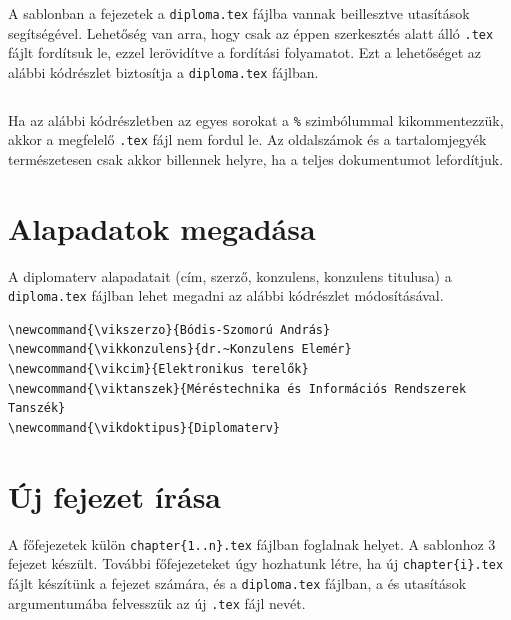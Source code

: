 A sablonban a fejezetek a \verb+diploma.tex+ fájlba vannak beillesztve \verb++ utasítások segítségével. Lehetőség van arra, hogy csak az éppen szerkesztés alatt álló \verb+.tex+ fájlt fordítsuk le, ezzel lerövidítve a fordítási folyamatot. Ezt a lehetőséget az alábbi kódrészlet biztosítja a \verb+diploma.tex+ fájlban.
\begin{lstlisting}[frame=single,float=!ht]

\end{lstlisting}

Ha az alábbi kódrészletben az egyes sorokat a \verb+%+ szimbólummal kikommentezzük, akkor a megfelelő \verb+.tex+ fájl nem fordul le. Az oldalszámok és a tartalomjegyék természetesen csak akkor billennek helyre, ha a teljes dokumentumot lefordítjuk.

\newpage
\section{Alapadatok megadása}
A diplomaterv alapadatait (cím, szerző, konzulens, konzulens titulusa) a \verb+diploma.tex+ fájlban lehet megadni az alábbi kódrészlet módosításával.
\begin{lstlisting}[frame=single,float=!ht]
\newcommand{\vikszerzo}{Bódis-Szomorú András}
\newcommand{\vikkonzulens}{dr.~Konzulens Elemér}
\newcommand{\vikcim}{Elektronikus terelők}
\newcommand{\viktanszek}{Méréstechnika és Információs Rendszerek Tanszék}
\newcommand{\vikdoktipus}{Diplomaterv}
\end{lstlisting}

\section{Új fejezet írása}
A főfejezetek külön \verb+chapter{1..n}.tex+ fájlban foglalnak helyet. A sablonhoz 3 fejezet készült. További főfejezeteket úgy hozhatunk létre, ha új \verb+chapter{i}.tex+ fájlt készítünk a fejezet számára, és a \verb+diploma.tex+ fájlban, a \verb++ és \verb++ utasítások argumentumába felvesszük az új \verb+.tex+ fájl nevét.


